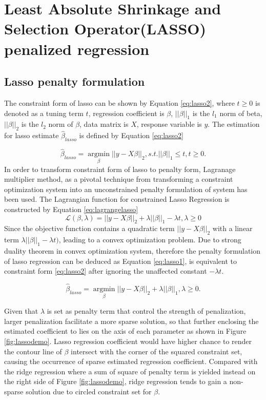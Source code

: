 \section{Least Absolute Shrinkage and Selection Operator(LASSO) penalized regression}
\subsection{Lasso penalty formulation}
The constraint form of lasso can be shown by Equation \ref{eq:lasso2}, where $t \geq 0$ is denoted as a tuning term $t$, regression coefficient is $\beta$, $||\beta||_1$ is the $l_1$ norm of beta, $||\beta||_2$ is the $l_2$ norm of $\beta$, data matrix is $X$, response variable is $y$. The estimation for lasso estimate $\hat{\beta}_{lasso}$ is defined by Equation \ref{eq:lasso2}

\begin{equation}
	\label{eq:lasso2}
	\hat{\beta}_{lasso} = \underset{\beta}{\operatorname{argmin}} ||y-X\beta||_2, s.t. ||\beta||_1 \leq t, t \geq 0.
\end{equation}
In order to transform constraint form of lasso to penalty form, Lagranage multiplier method, as a pivotal technique from transforming a constraint optimization system into an unconstrained penalty formulation of system has been used. The Lagrangian function for constrained Lasso Regression is constructed by Equation \ref{eq:lagrangelasso}
\begin{equation}
	\label{eq:lagrangelasso}
	\mathcal{L}(\beta,\lambda) =  ||y-X\beta||_2 + \lambda||\beta||_1 - \lambda t, \lambda \geq 0
\end{equation}
 Since the objective function contains a quadratic term $||y-X\beta||_2$ with a linear term $\lambda||\beta||_1 - \lambda t)$, leading to a convex optimization problem. Due to strong duality theorem in convex optimization system, therefore the penalty formulation of lasso regression can be deduced as Equation \ref{eq:lasso1}, is equivalent to constraint form \ref{eq:lasso2} after ignoring the unaffected constant $-\lambda t$.

\begin{equation}
	\label{eq:lasso1}
	\hat{\beta}_{lasso} = \underset{\beta}{\operatorname{argmin}} ||y-X\beta||_2 + \lambda ||\beta||_1, \lambda \geq 0.
\end{equation}

Given that $\lambda$ is set as penalty term that control the strength of penalization, larger penalization facilitate a more sparse solution, so that further enclosing the estimated coefficient to lies on the axis of each parameter as shown in Figure \ref{fig:lassodemo}. Lasso regression coefficient would have higher chance to render the contour line of $\beta$ intersect with the corner of the squared constraint set, causing the occurrence of sparse estimated regression coefficient. Compared with the ridge regression where a sum of square of penalty term is yielded instead on the right side of Figure \ref{fig:lassodemo}, ridge regression tends to gain a non-sparse solution due to circled constraint set for $\beta$.

